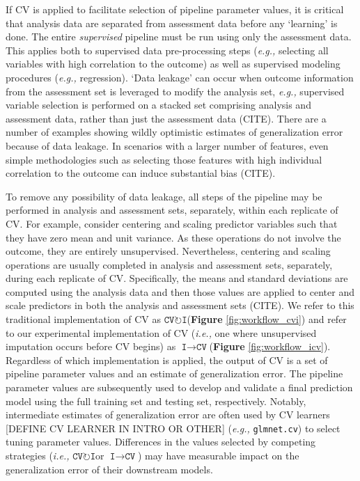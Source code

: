 \documentclass[AMA,STIX1COL,doublespace]{WileyNJD-v2}
\begin{document}
If CV is applied to facilitate selection of pipeline parameter values,
it is critical that analysis data are separated from assessment data
before any `learning' is done. The entire \emph{supervised} pipeline
must be run using only the assessment data. This applies both to
supervised data pre-processing steps (\textit{e.g., }selecting all
variables with high correlation to the outcome) as well as supervised
modeling procedures (\textit{e.g., }regression). `Data leakage' can
occur when outcome information from the assessment set is leveraged to
modify the analysis set, \textit{e.g., }supervised variable selection is
performed on a stacked set comprising analysis and assessment data,
rather than just the assessment data (CITE). There are a number of
examples showing wildly optimistic estimates of generalization error
because of data leakage. In scenarios with a larger number of features,
even simple methodologies such as selecting those features with high
individual correlation to the outcome can induce substantial bias
(CITE).

To remove any possibility of data leakage, all steps of the pipeline may
be performed in analysis and assessment sets, separately, within each
replicate of CV. For example, consider centering and scaling predictor
variables such that they have zero mean and unit variance. As these
operations do not involve the outcome, they are entirely unsupervised.
Nevertheless, centering and scaling operations are usually completed in
analysis and assessment sets, separately, during each replicate of CV.
Specifically, the means and standard deviations are computed using the
analysis data and then those values are applied to center and scale
predictors in both the analysis and assessment sets (CITE). We refer to
this traditional implementation of CV as
$\texttt{CV}\!\circlearrowright\!\texttt{I}$\space (\textbf{Figure}
\ref{fig:workflow_cvi}) and refer to our experimental implementation of
CV (\textit{i.e., }one where unsupervised imputation occurs before CV
begins) as
$\texttt{I}\!\!\rightarrow\!\texttt{CV}$\space (\textbf{Figure}
\ref{fig:workflow_icv}). Regardless of which implementation is applied,
the output of CV is a set of pipeline parameter values and an estimate
of generalization error. The pipeline parameter values are subsequently
used to develop and validate a final prediction model using the full
training set and testing set, respectively. Notably, intermediate
estimates of generalization error are often used by CV learners
{[}DEFINE CV LEARNER IN INTRO OR OTHER{]}
(\textit{e.g., }\texttt{glmnet.cv}) to select tuning parameter values.
Differences in the values selected by competing strategies
(\textit{i.e., }$\texttt{CV}\!\circlearrowright\!\texttt{I}$\space or
$\texttt{I}\!\!\rightarrow\!\texttt{CV}$) may have measurable impact on
the generalization error of their downstream models.
\end{document}
